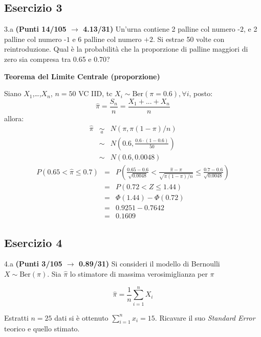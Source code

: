 \documentclass[
  11pt,
]{book}
\theoremstyle{mytheoremstyle}
\theoremstyle{mydefstyle}
\newenvironment{sol}
  {
  \begin{tcolorbox}[enhanced,breakable,arc=0.1mm,boxrule=1pt,colback=white,colframe=iblue,
  title=\bf \fontfamily{lmss}\selectfont \hspace{.5 cm} Soluzione,drop fuzzy shadow]

}{
\end{tcolorbox}
  }
\begin{document}
\subsection{Esercizio 3}\label{esercizio-3-40}

3.a \textbf{(Punti 14/105 \(\rightarrow\) 4.13/31)} Un'urna contiene 2 palline col numero \(\mbox{-2}\), e 2 palline col numero \(\mbox{-1}\) e 6 palline col numero \(\mbox{+2}\).
Si estrae 50 volte con reintroduzione.
Qual è la probabilità che la proporzione di palline maggiori di zero sia compresa tra 0.65 e 0.70?

\begin{sol}
\textbf{Teorema del Limite Centrale (proporzione)}

Siano \(X_1\),\ldots,\(X_n\), \(n=50\) VC IID, tc \(X_i\sim\text{Ber}(\pi=0.6)\)\(,\forall i\), posto:
\[
      \hat\pi=\frac{S_n}n = \frac{X_1 + ... + X_n}n
      \]
allora:\begin{eqnarray*}
  \hat\pi & \mathop{\sim}\limits_{a}& N(\pi,\pi(1-\pi)/n) \\
  &\sim & N\left(0.6,\frac{0.6\cdot(1-0.6)}{50}\right) \\
     &\sim & N(0.6,0.0048) 
  \end{eqnarray*}\begin{eqnarray*}
   P( 0.65 < \hat\pi \leq  0.7 ) &=& P\left( \frac { 0.65  -  0.6 }{\sqrt{ 0.0048 }} < \frac { \hat\pi  -  \pi }{ \sqrt{\pi(1-\pi)/n} } \leq \frac { 0.7  -  0.6 }{\sqrt{ 0.0048 }}\right)  \\
              &=& P\left(  0.72  < Z \leq  1.44 \right) \\
              &=& \Phi( 1.44 )-\Phi( 0.72 )\\
              &=&  0.9251 - 0.7642 \\ 
              &=&  0.1609 
   \end{eqnarray*}

\end{sol}

\subsection{Esercizio 4}\label{esercizio-4-40}

4.a \textbf{(Punti 3/105 \(\rightarrow\) 0.89/31)} Si consideri il modello di Bernoulli \(X\sim\text{Ber}(\pi)\). Sia \(\hat\pi\) lo stimatore di massima verosimiglianza per \(\pi\)

\[
  \hat\pi = \frac 1n \sum_{i=1}^n X_i
\]

Estratti \(n=25\) dati si è ottenuto \(\sum_{i=1}^n x_i = 15\). Ricavare il suo \emph{Standard Error} teorico e quello stimato.
\end{document}
